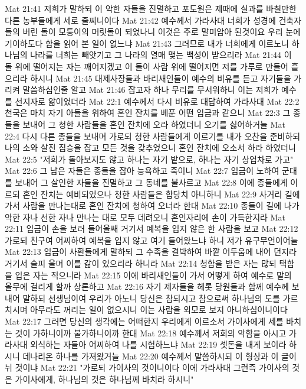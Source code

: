 Mat 21:41  저희가 말하되 이 악한 자들을 진멸하고 포도원은 제때에 실과를 바칠만한 다른 농부들에게 세로 줄찌니이다
Mat 21:42  예수께서 가라사대 너희가 성경에 건축자들의 버린 돌이 모퉁이의 머릿돌이 되었나니 이것은 주로 말미암아 된것이요 우리 눈에 기이하도다 함을 읽어 본 일이 없느냐
Mat 21:43  그러므로 내가 너희에게 이르노니 하나님의 나라를 너희는 빼앗기고 그 나라의 열매 맺는 백성이 받으리라
Mat 21:44  이 돌 위에 떨어지는 자는 깨어지겠고 이 돌이 사람 위에 떨어지면 저를 가루로 만들어 흩으리라 하시니
Mat 21:45  대제사장들과 바리새인들이 예수의 비유를 듣고 자기들을 가리켜 말씀하심인줄 알고
Mat 21:46  잡고자 하나 무리를 무서워하니 이는 저희가 예수를 선지자로 앎이었더라
Mat 22:1  예수께서 다시 비유로 대답하여 가라사대
Mat 22:2  천국은 마치 자기 아들을 위하여 혼인 잔치를 베푼 어떤 임금과 같으니
Mat 22:3  그 종들을 보내어 그 청한 사람들을 혼인 잔치에 오라 하였더니 오기를 싫어하거늘
Mat 22:4  다시 다른 종들을 보내며 가로되 청한 사람들에게 이르기를 내가 오찬을 준비하되 나의 소와 살진 짐승을 잡고 모든 것을 갖추었으니 혼인 잔치에 오소서 하라 하였더니
Mat 22:5  "저희가 돌아보지도 않고 하나는 자기 밭으로, 하나는 자기 상업차로 가고"
Mat 22:6  그 남은 자들은 종들을 잡아 능욕하고 죽이니
Mat 22:7  임금이 노하여 군대를 보내어 그 살인한 자들을 진멸하고 그 동네를 불사르고
Mat 22:8  이에 종들에게 이르되 혼인 잔치는 예비되었으나 청한 사람들은 합당치 아니하니
Mat 22:9  사거리 길에 가서 사람을 만나는대로 혼인 잔치에 청하여 오너라 한대
Mat 22:10  종들이 길에 나가 악한 자나 선한 자나 만나는 대로 모두 데려오니 혼인자리에 손이 가득한지라
Mat 22:11  임금이 손을 보러 들어올쌔 거기서 예복을 입지 않은 한 사람을 보고
Mat 22:12  가로되 친구여 어찌하여 예복을 입지 않고 여기 들어왔느냐 하니 저가 유구무언이어늘
Mat 22:13  임금이 사환들에게 말하되 그 수족을 결박하여 바깥 어두움에 내어 던지라 거기서 슬피 울며 이를 갊이 있으리라 하니라
Mat 22:14  청함을 받은 자는 많되 택함을 입은 자는 적으니라
Mat 22:15  이에 바리새인들이 가서 어떻게 하여 예수로 말의 올무에 걸리게 할까 상론하고
Mat 22:16  자기 제자들을 헤롯 당원들과 함께 예수께 보내어 말하되 선생님이여 우리가 아노니 당신은 참되시고 참으로써 하나님의 도를 가르치시며 아무라도 꺼리는 일이 없으시니 이는 사람을 외모로 보지 아니하심이니이다
Mat 22:17  그러면 당신의 생각에는 어떠한지 우리에게 이르소서 가이사에게 세를 바치는 것이 가하니이까 불가하니이까 한대
Mat 22:18  예수께서 저희의 악함을 아시고 가라사대 외식하는 자들아 어찌하여 나를 시험하느냐
Mat 22:19  셋돈을 내게 보이라 하시니 데나리온 하나를 가져왔거늘
Mat 22:20  예수께서 말씀하시되 이 형상과 이 글이 뉘 것이냐
Mat 22:21  "가로되 가이사의 것이니이다 이에 가라사대 그런즉 가이사의 것은 가이사에게, 하나님의 것은 하나님께 바치라 하시니"
